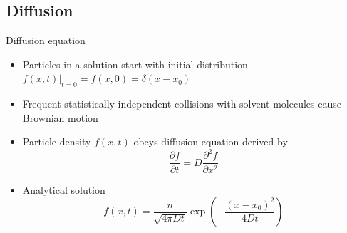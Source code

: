 \documentclass[]{beamer}
\begin{document}
\subsection{Diffusion}
\begin{frame}{Diffusion equation}
	\begin{itemize}
		\item Particles in a solution start with initial distribution $f(x,t)|_{t=0} = f(x,0) = \delta(x-x_0)$
		\item Frequent statistically independent collisions with solvent molecules cause Brownian motion
		\item Particle density $f(x,t)$ obeys diffusion equation derived by \cite{einstein_motion_1905} 
		\begin{equation*}
			\frac{\partial f}{\partial t} = D \frac{\partial^2 f}{\partial x^2}
		\end{equation*}
		\item<+-> Analytical solution
		\begin{equation*}
			f(x,t) = \frac{n}{\sqrt{4\pi D t}} \exp\left({-\frac{(x-x_0)^2}{4Dt}}\right)
		\end{equation*}
	\end{itemize}
\end{frame}
		
\end{document}
